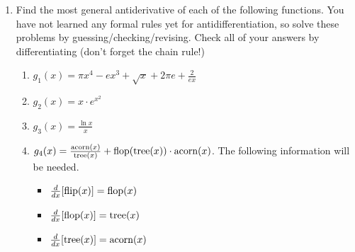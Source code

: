 \documentclass{article}
\begin{document}
\begin{enumerate}
                \item Find the most general antiderivative of each of the following functions. You have not learned any formal rules yet for antidifferentiation, so solve these problems by guessing/checking/revising. Check all of your answers by differentiating (don't forget the chain rule!)
                    \begin{enumerate}
                        \item $ g_1(x) = \pi x^4-ex^3+\sqrt{x}+2\pi e + \frac{2}{ex}$
                        \item $g_2(x) = x\cdot e^{x^2}$
                        \item $g_3(x) = \frac{\ln{x}}{x}$
                        \item $g_4(x)= \frac{\textnormal{acorn}(x)}{\textnormal{tree}(x)} +\textnormal{flop}(\textnormal{tree}(x))\cdot \textnormal{acorn}(x)$.  The following information will be needed.
                        \begin{itemize}
                            \item $\frac{d}{dx}[\textnormal{flip}(x)] = \textnormal{flop}(x)$
                            \item $\frac{d}{dx}[\textnormal{flop}(x)] = \textnormal{tree}(x)$
                            \item $\frac{d}{dx}[\textnormal{tree}(x)] = \textnormal{acorn}(x)$
                        \end{itemize}
                    \end{enumerate}
 

\end{enumerate}
\end{document}
